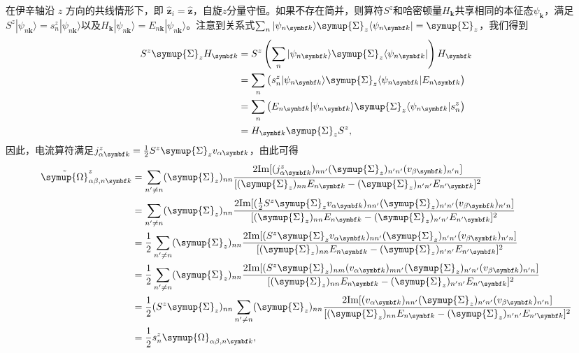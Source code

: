     在伊辛轴沿 $z$ 方向的共线情形下，即 $\hat{\symbf{z}}_i=\hat{\symbf{z}}$，自旋$z$分量守恒。如果不存在简并，则算符$S^z$和哈密顿量$H_{\bm{k}}$共享相同的本征态$\psi_{\bm{k}}$，满足$S^z |\psi_{n{\bm{k}}}\rangle=s_n^z|\psi_{n{\bm{k}}}\rangle$以及$H_{\bm{k}}|\psi_{n{\bm{k}}}\rangle=E_{n{\bm{k}}}|\psi_{n{\bm{k}}}\rangle$。注意到关系式$\sum_n|\psi_{n{\bm{k}}}\rangle\symup{\Sigma}_z\langle\psi_{n{\bm{k}}}|=\symup{\Sigma}_z$，我们得到
    \begin{align}
        S^z\symup{\Sigma}_z H_{\bm{k}}&=S^z\left(\sum_n|\psi_{n{\bm{k}}}\rangle\symup{\Sigma}_z\langle\psi_{n{\bm{k}}}|\right) H_{\bm{k}}\nonumber\\
        &=\sum_n \left(s_n^z|\psi_{n{\bm{k}}}\rangle\symup{\Sigma}_z\langle\psi_{n{\bm{k}}}| E_{n{\bm{k}}}\right)\nonumber\\
        &=\sum_n \left(E_{n{\bm{k}}}|\psi_{n{\bm{k}}}\rangle\symup{\Sigma}_z\langle\psi_{n{\bm{k}}}|s_n^z\right)\\
        &=H_{\bm{k}}\symup{\Sigma}_z S^z,
    \end{align}
    因此，电流算符满足$j_{\alpha {\bm{k}}}^{z}=\frac{1}{2} S^{z} \symup{\Sigma}_z v_{\alpha {\bm{k}}}$，由此可得
    \begin{align}
        \tilde{\symup{\Omega}}_{\alpha \beta ,n{\bm{k}}}^{z} &=\sum _{n'\neq n} (\symup{\Sigma}_z )_{nn}\frac{2\text{Im} [(j_{\alpha {\bm{k}}}^{z} )_{nn'} (\symup{\Sigma}_z )_{n'n'} (v_{\beta {\bm{k}}} )_{n'n} ]}{[ (\symup{\Sigma}_z )_{nn} E_{n{\bm{k}}} -(\symup{\Sigma}_z )_{n'n'} E_{n'{\bm{k}}}]^{2}}\nonumber\\
         & =\sum _{n'\neq n} (\symup{\Sigma}_z )_{nn}\frac{2\text{Im} [(\frac{1}{2} S^{z} \symup{\Sigma}_z v_{\alpha {\bm{k}}} )_{nn'} (\symup{\Sigma}_z )_{n'n'} (v_{\beta {\bm{k}}} )_{n'n} ]}{[ (\symup{\Sigma}_z )_{nn} E_{n{\bm{k}}} -(\symup{\Sigma}_z )_{n'n'} E_{n'{\bm{k}}}]^{2}}\nonumber\\
         & =\frac{1}{2}\sum _{n'\neq n} (\symup{\Sigma}_z )_{nn}\frac{2\text{Im} [(S^{z} \symup{\Sigma}_z v_{\alpha {\bm{k}}} )_{nn'} (\symup{\Sigma}_z )_{n'n'} (v_{\beta {\bm{k}}} )_{n'n} ]}{[ (\symup{\Sigma}_z )_{nn} E_{n{\bm{k}}} -(\symup{\Sigma}_z )_{n'n'} E_{n'{\bm{k}}}]^{2}}\nonumber\\
         & =\frac{1}{2}\sum _{n'\neq n} (\symup{\Sigma}_z )_{nn}\frac{2\text{Im} [(S^{z} \symup{\Sigma}_z)_{nm}( v_{\alpha {\bm{k}}} )_{mn'} (\symup{\Sigma}_z )_{n'n'} (v_{\beta {\bm{k}}} )_{n'n} ]}{[ (\symup{\Sigma}_z )_{nn} E_{n{\bm{k}}} -(\symup{\Sigma}_z )_{n'n'} E_{n'{\bm{k}}}]^{2}}\nonumber\\
         & =\frac{1}{2} (S^{z} \symup{\Sigma}_z)_{nn}\sum _{n'\neq n} (\symup{\Sigma}_z )_{nn}\frac{2\text{Im} [( v_{\alpha {\bm{k}}} )_{nn'} (\symup{\Sigma}_z )_{n'n'} (v_{\beta {\bm{k}}} )_{n'n} ]}{[ (\symup{\Sigma}_z )_{nn} E_{n{\bm{k}}} -(\symup{\Sigma}_z )_{n'n'} E_{n'{\bm{k}}}]^{2}}\nonumber\\
         & =\frac{1}{2}s_n^{z} \symup{\Omega}_{\alpha \beta ,n{\bm{k}}},
    \end{align}
